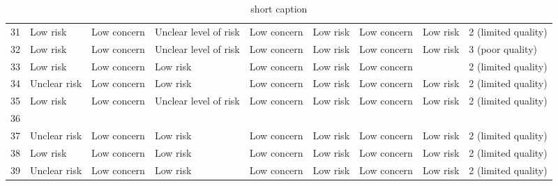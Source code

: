 \begin{table}[ht]
\begin{tabular}{rllllllll}
  31 & Low risk & Low concern & Unclear level of risk & Low concern & Low risk & Low concern & Low risk & 2 (limited quality) \\ 
  32 & Low risk & Low concern & Unclear level of risk & Low concern & Low risk & Low concern & Low risk & 3 (poor quality) \\ 
  33 & Low risk & Low concern & Low risk & Low concern & Low risk & Low concern &  & 2 (limited quality) \\ 
  34 & Unclear risk & Low concern & Low risk & Low concern & Low risk & Low concern & Low risk & 2 (limited quality) \\ 
  35 & Low risk & Low concern & Unclear level of risk & Low concern & Low risk & Low concern & Low risk & 2 (limited quality) \\ 
  36 &  &  &  &  &  &  &  &  \\ 
  37 & Unclear risk & Low concern & Low risk & Low concern & Low risk & Low concern & Low risk & 2 (limited quality) \\ 
  38 & Low risk & Low concern & Low risk & Low concern & Low risk & Low concern & Low risk & 2 (limited quality) \\ 
  39 & Unclear risk & Low concern & Low risk & Low concern & Low risk & Low concern & Low risk & 2 (limited quality) \\ 
   \hline
\end{tabular}
\caption[full caption]{short caption} 
\label{tab:qual_scores}
\end{table}
